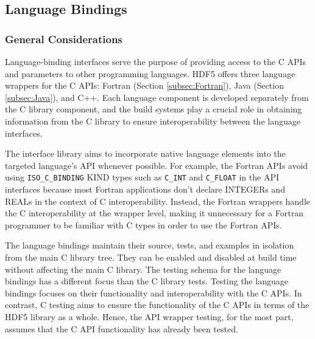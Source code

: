 

\subsection{Language Bindings\label{subsec:LangBindings}}

\subsubsection{General Considerations}
Language-binding interfaces serve the purpose of providing access to the C APIs and parameters to other programming languages. HDF5 offers three language wrappers for the C APIs: Fortran (Section \ref{subsec:Fortran}), Java (Section \ref{subsec:Java}), and C++. Each language component is developed separately from the C library component, and the build systems play a crucial role in obtaining information from the C library to ensure interoperability between the language interfaces.

The interface library aims to incorporate native language elements into the targeted language's API whenever possible. For example, the Fortran APIs avoid using \texttt{ISO\_C\_BINDING} KIND types such as \texttt{C\_INT} and \texttt{C\_FLOAT} in the API interfaces because most Fortran applications don't declare INTEGERs and REALs in the context of C interoperability. Instead, the Fortran wrappers handle the C interoperability at the wrapper level, making it unnecessary for a Fortran programmer to be familiar with C types in order to use the Fortran APIs.

The language bindings maintain their source, tests, and examples in isolation from the main C library tree. They can be enabled and disabled at build time without affecting the main C library. The testing schema for the language bindings has a different focus than the C library tests. Testing the language bindings focuses on their functionality and interoperability with the C APIs. In contrast, C testing aims to ensure the functionality of the C APIs in terms of the HDF5 library as a whole. Hence, the API wrapper testing, for the most part, assumes that the C API functionality has already been tested.

